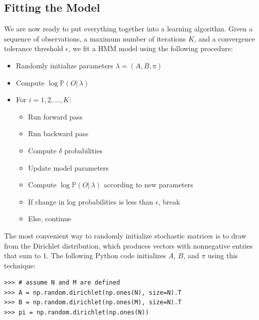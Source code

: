 \subsection*{Fitting the Model}
We are now ready to put everything together into a learning algorithm.
Given a sequence of observations, a maximum number of iterations $K$, and a convergence tolerance threshold $\epsilon$, we fit a HMM model using the following procedure:
\begin{itemize}
\item Randomly initialize parameters $\lambda = (A, B, \pi)$
\item Compute $\log \mathbb{P}(O |\, \lambda)$
\item For $i=1, 2, \ldots, K$:
\begin{itemize}
\item Run forward pass
\item Run backward pass
\item Compute $\delta$ probabilities
\item Update model parameters
\item Compute $\log \mathbb{P}(O |\, \lambda)$ according to new parameters
\item If change in log probabilities is less than $\epsilon$, break
\item Else, continue
\end{itemize}
\end{itemize}

The most convenient way to randomly initialize stochastic matrices is to draw from the Dirichlet distribution,
which produces vectors with nonnegative entries that sum to 1.
The following Python code initializes $A$, $B$, and $\pi$ using this technique:
\begin{lstlisting}
>>> # assume N and M are defined
>>> A = np.random.dirichlet(np.ones(N), size=N).T
>>> B = np.random.dirichlet(np.ones(M), size=N).T
>>> pi = np.random.dirichlet(np.ones(N))
\end{lstlisting}

